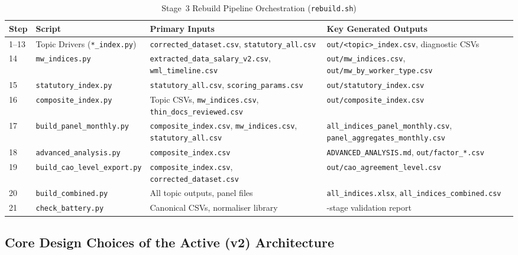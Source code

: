 \begin{table}[H]
\centering
\small
\caption{Stage~3 Rebuild Pipeline Orchestration (\nolinkurl{rebuild.sh})}
\label{tab:rebuild_pipeline}
\begin{tabularx}{\textwidth}{l >{\raggedright\arraybackslash}p{4.0cm} >{\raggedright\arraybackslash}p{4.0cm} >{\raggedright\arraybackslash}X}
\toprule
\textbf{Step} & \textbf{Script} & \textbf{Primary Inputs} & \textbf{Key Generated Outputs} \\
\midrule
1--13 & 13 Topic Drivers (\nolinkurl{*_index.py}) & \nolinkurl{corrected_dataset.csv}, \nolinkurl{statutory_all.csv} & \nolinkurl{out/<topic>_index.csv}, diagnostic CSVs \\
14 & \nolinkurl{mw_indices.py} & \nolinkurl{extracted_data_salary_v2.csv}, \nolinkurl{wml_timeline.csv} & \nolinkurl{out/mw_indices.csv}, \nolinkurl{out/mw_by_worker_type.csv} \\
15 & \nolinkurl{statutory_index.py} & \nolinkurl{statutory_all.csv}, \nolinkurl{scoring_params.csv} & \nolinkurl{out/statutory_index.csv} \\
16 & \nolinkurl{composite_index.py} & Topic CSVs, \nolinkurl{mw_indices.csv}, \nolinkurl{thin_docs_reviewed.csv} & \nolinkurl{out/composite_index.csv} \\
17 & \nolinkurl{build_panel_monthly.py} & \nolinkurl{composite_index.csv}, \nolinkurl{mw_indices.csv}, \nolinkurl{statutory_all.csv} & \nolinkurl{all_indices_panel_monthly.csv}, \nolinkurl{panel_aggregates_monthly.csv} \\
18 & \nolinkurl{advanced_analysis.py} & \nolinkurl{composite_index.csv} & \nolinkurl{ADVANCED_ANALYSIS.md}, \nolinkurl{out/factor_*.csv} \\
19 & \nolinkurl{build_cao_level_export.py} & \nolinkurl{composite_index.csv}, \nolinkurl{corrected_dataset.csv} & \nolinkurl{out/cao_agreement_level.csv} \\
20 & \nolinkurl{build_combined.py} & All topic outputs, panel files & \nolinkurl{all_indices.xlsx}, \nolinkurl{all_indices_combined.csv} \\
21 & \nolinkurl{check_battery.py} & Canonical CSVs, normaliser library & 6-stage validation report \\
\bottomrule
\end{tabularx}
\end{table}

\subsection{Core Design Choices of the Active (v2) Architecture}
\label{sec:v1_v2_transition}

